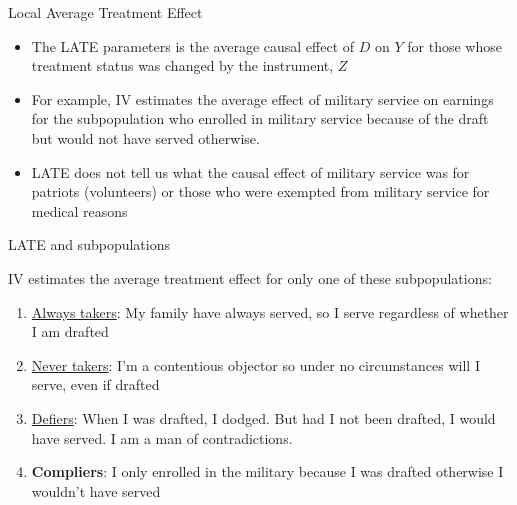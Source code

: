 \documentclass{beamer}
\begin{document}
\begin{frame}{Local Average Treatment Effect}
	
	\begin{itemize}
	\item The LATE parameters is the average causal effect of $D$ on $Y$ for those whose treatment status was changed by the instrument, $Z$
	\item For example, IV estimates the average effect of military service on earnings for the subpopulation who enrolled in military service because of the draft but would not have served otherwise. 
	\item LATE does not tell us what the causal effect of military service was for patriots (volunteers) or those who were exempted from military service for medical reasons 
	\end{itemize}
	
\end{frame}


\begin{frame}{LATE and subpopulations}
	
IV estimates the average treatment effect for only one of these subpopulations:
		\begin{enumerate}
		\item \underline{Always takers}: My family have always served, so I serve regardless of whether I am drafted
		\item \underline{Never takers}: I'm a contentious objector so under no circumstances will I serve, even if drafted
		\item \underline{Defiers}: When I was drafted, I dodged. But had I not been drafted, I would have served. I am a man of contradictions.
		\item \textbf{Compliers}: I only enrolled in the military because I was drafted otherwise I wouldn't have served
		\end{enumerate}
\end{frame}
\end{document}
